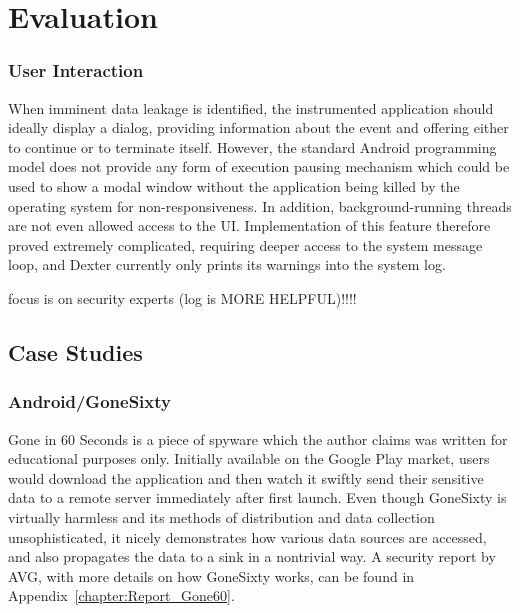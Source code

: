 \documentclass[12pt,twoside,notitlepage]{report}
\begin{document}
\cleardoublepage
\chapter{Evaluation}

\subsection{User Interaction}

When imminent data leakage is identified, the instrumented application should ideally display a dialog, providing information about the event and offering either to continue or to terminate itself. However, the standard Android programming model does not provide any form of execution pausing mechanism which could be used to show a modal window without the application being killed by the operating system for non-responsiveness. In addition, background-running threads are not even allowed access to the UI. Implementation of this feature therefore proved extremely complicated, requiring deeper access to the system message loop, and Dexter currently only prints its warnings into the system log.

focus is on security experts (log is MORE HELPFUL)!!!!

\section{Case Studies}

\subsection{Android/GoneSixty}

Gone in 60 Seconds is a piece of spyware which the author claims was written for educational purposes only. Initially available on the Google Play market, users would download the application and then watch it swiftly send their sensitive data to a remote server immediately after first launch. Even though GoneSixty is virtually harmless and its methods of distribution and data collection unsophisticated, it nicely demonstrates how various data sources are accessed, and also propagates the data to a sink in a nontrivial way. A security report by AVG, with more details on how GoneSixty works, can be found in Appendix~\ref{chapter:Report_Gone60}.
\end{document}
